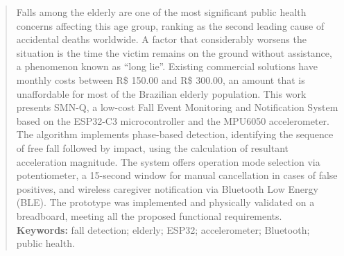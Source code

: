\documentclass[a4paper,12pt]{article}
\newcommand{\keyword}[1]{\textsf{#1}}
\begin{document}
\begin{abstract}
\noindent
Falls among the elderly are one of the most significant public health concerns affecting this age group, ranking as the second leading cause of accidental deaths worldwide. A factor that considerably worsens the situation is the time the victim remains on the ground without assistance, a phenomenon known as ``long lie''. Existing commercial solutions have monthly costs between R\$ 150.00 and R\$ 300.00, an amount that is unaffordable for most of the Brazilian elderly population. This work presents SMN-Q, a low-cost Fall Event Monitoring and Notification System based on the ESP32-C3 microcontroller and the MPU6050 accelerometer. The algorithm implements phase-based detection, identifying the sequence of free fall followed by impact, using the calculation of resultant acceleration magnitude. The system offers operation mode selection via potentiometer, a 15-second window for manual cancellation in cases of false positives, and wireless caregiver notification via Bluetooth Low Energy (BLE). The prototype was implemented and physically validated on a breadboard, meeting all the proposed functional requirements.
\\\textbf{\keyword{Keywords:}} fall detection; elderly; ESP32; accelerometer; Bluetooth; public health.
\end{abstract}

 \onehalfspace  %
 \setlength{\parindent}{1.25cm}






 \newpage
{}


\end{document}
